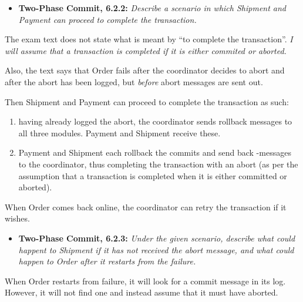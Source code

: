 \begin{itemize}
  \item \textbf{Two-Phase Commit, 6.2.2:}
        \textit{Describe a scenario in which Shipment and Payment can proceed to
        complete the transaction.}
\end{itemize}

The exam text does not state what is meant by ``to complete the transaction''.
\textit{I will assume that a transaction is completed if it is either commited
or aborted.}
\medskip

Also, the text says that Order fails after the coordinator decides to abort and
after the abort has been logged, but \emph{before} abort messages are sent out.
\medskip

Then Shipment and Payment can proceed to complete the transaction as such:

\begin{enumerate}
  \item having already logged the abort, the coordinator sends rollback messages
    to all three modules. Payment and Shipment receive these.
  \item Payment and Shipment each rollback the commits and send back
    -messages to the coordinator, thus completing the
    transaction with an abort (as per the assumption that a transaction is
  completed when it is either committed or aborted).
\end{enumerate}

When Order comes back online, the coordinator can retry the transaction if it
wishes.


\begin{itemize}
  \item \textbf{Two-Phase Commit, 6.2.3:}
        \textit{Under the given scenario, describe what could happent to
        Shipment if it has not received the abort message, and what could happen
      to Order after it restarts from the failure.}
\end{itemize}

When Order restarts from failure, it will look for a commit message in its log.
However, it will not find one and instead assume that it must have aborted.

\Sectend
